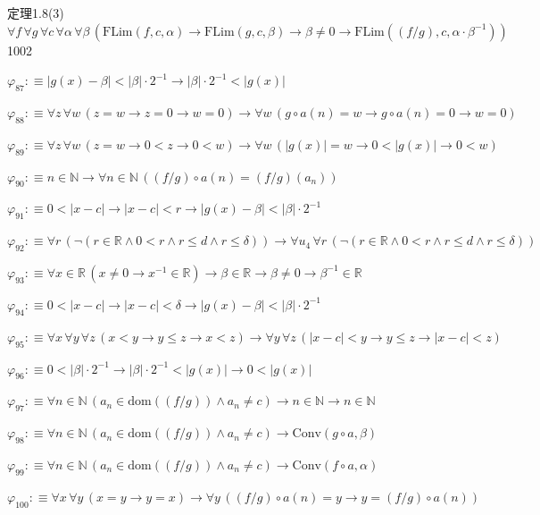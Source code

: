\begin{fullproof}{定理1.8(3)}{$\forall f\,\forall g\,\forall c\,\forall \alpha\,\forall \beta\,(\mathrm{FLim}(f,c,\alpha) \to \mathrm{FLim}(g,c,\beta) \to \beta \neq 0 \to \mathrm{FLim}((f / g),c,\alpha \cdot \beta^{-1}))$}{1002}
\begin{abbrevlist}
\item $\varphi_{87} :\equiv \lvert g(x) - \beta \rvert < \lvert \beta \rvert \cdot 2^{-1} \to \lvert \beta \rvert \cdot 2^{-1} < \lvert g(x) \rvert$
\item $\varphi_{88} :\equiv \forall z\,\forall w\,(z = w \to z = 0 \to w = 0) \to \forall w\,(g \circ a(n) = w \to g \circ a(n) = 0 \to w = 0)$
\item $\varphi_{89} :\equiv \forall z\,\forall w\,(z = w \to 0 < z \to 0 < w) \to \forall w\,(\lvert g(x) \rvert = w \to 0 < \lvert g(x) \rvert \to 0 < w)$
\item $\varphi_{90} :\equiv n \in \mathbb{N} \to \forall n \in \mathbb{N}\,((f / g) \circ a(n) = (f / g)(a_{n}))$
\item $\varphi_{91} :\equiv 0 < \lvert x - c \rvert \to \lvert x - c \rvert < r \to \lvert g(x) - \beta \rvert < \lvert \beta \rvert \cdot 2^{-1}$
\item $\varphi_{92} :\equiv \forall r\,(\neg (r \in \mathbb{R} \land 0 < r \land r \leq d \land r \leq \delta)) \to \forall u_{4}\,\forall r\,(\neg (r \in \mathbb{R} \land 0 < r \land r \leq d \land r \leq \delta))$
\item $\varphi_{93} :\equiv \forall x \in \mathbb{R}\,(x \neq 0 \to x^{-1} \in \mathbb{R}) \to \beta \in \mathbb{R} \to \beta \neq 0 \to \beta^{-1} \in \mathbb{R}$
\item $\varphi_{94} :\equiv 0 < \lvert x - c \rvert \to \lvert x - c \rvert < \delta \to \lvert g(x) - \beta \rvert < \lvert \beta \rvert \cdot 2^{-1}$
\item $\varphi_{95} :\equiv \forall x\,\forall y\,\forall z\,(x < y \to y \leq z \to x < z) \to \forall y\,\forall z\,(\lvert x - c \rvert < y \to y \leq z \to \lvert x - c \rvert < z)$
\item $\varphi_{96} :\equiv 0 < \lvert \beta \rvert \cdot 2^{-1} \to \lvert \beta \rvert \cdot 2^{-1} < \lvert g(x) \rvert \to 0 < \lvert g(x) \rvert$
\item $\varphi_{97} :\equiv \forall n \in \mathbb{N}\,(a_{n} \in \mathrm{dom}((f / g)) \land a_{n} \neq c) \to n \in \mathbb{N} \to n \in \mathbb{N}$
\item $\varphi_{98} :\equiv \forall n \in \mathbb{N}\,(a_{n} \in \mathrm{dom}((f / g)) \land a_{n} \neq c) \to \mathrm{Conv}(g \circ a,\beta)$
\item $\varphi_{99} :\equiv \forall n \in \mathbb{N}\,(a_{n} \in \mathrm{dom}((f / g)) \land a_{n} \neq c) \to \mathrm{Conv}(f \circ a,\alpha)$
\item $\varphi_{100} :\equiv \forall x\,\forall y\,(x = y \to y = x) \to \forall y\,((f / g) \circ a(n) = y \to y = (f / g) \circ a(n))$

\end{abbrevlist}
\end{fullproof}
